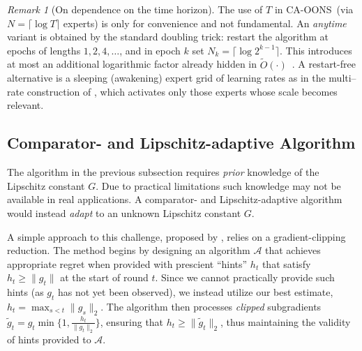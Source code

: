 \documentclass{article}
\renewcommand{\citet}{\citep}
\theoremstyle{plain}
\theoremstyle{definition}
\theoremstyle{remark}
\newtheorem{remark}[theorem]{Remark}
\newcommand{\cA}{\mathcal{A}}
\newcommand{\cawe}{{\sc CA-OONS}}
\newcommand{\regret}{\mathfrak{R}}
\renewcommand{\tilde}{\widetilde}
\begin{document}

\begin{remark}[On dependence on the time horizon]\label{remark:anytime}
The use of $T$ in \cawe\ (via $N=\lceil \log T\rceil$ experts) is only for convenience and not fundamental. An \emph{anytime} variant is obtained by the standard doubling trick: restart the algorithm at epochs of lengths $1,2,4,\dots$, and in epoch $k$ set $N_k=\lceil \log 2^{k-1}\rceil$. This introduces at most an additional logarithmic factor already hidden in $\tilde{O}(\cdot)$~\citep[Section 4.3]{zhao2021bandit}. A restart-free alternative is a sleeping (awakening) expert grid of learning rates as in the multi–rate construction of \citet{mhammedi2019lipschitz}, which activates only those experts whose scale becomes relevant. 
\end{remark}

\subsection{Comparator- and Lipschitz-adaptive Algorithm}\label{sec:fullyfree}
The algorithm in the previous subsection requires \emph{prior} knowledge of the Lipschitz constant $G$. Due to practical limitations such knowledge may not be available in real applications. A comparator- and Lipschitz-adaptive algorithm would instead {\em adapt} to an unknown Lipschitz constant $G$. %

\iffalse
A simple approach to this challenge, proposed by \citet{cutkosky2019artificial}, relies on a gradient-clipping reduction. The method begins by designing an algorithm $\cA$ that achieves appropriate regret when provided with prescient ``hints'' $h_t$ that satisfy $h_t \geq \|g_t\|$ at the start of round $t$. 
\iffalse
Since we cannot practically provide such hints (as $g_t$ has not yet been observed), we instead utilize our best estimate, $h_t = \max_{s<t} \|g_s\|_2$. The algorithm then processes \emph{clipped} subgradients $\tilde{g}_t = g_t \min\{1, \frac{h_t}{\|g_t\|_2}\}$, ensuring that $h_t \geq \|\tilde{g}_t\|_2$, thus maintaining the validity of hints provided to $\cA$. 
\end{document}
